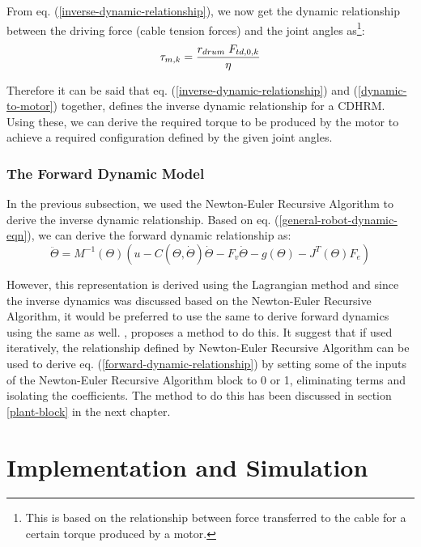 \documentclass[a4paper,12pt]{report}
\begin{document}
From eq. (\ref{inverse-dynamic-relationship}), we now get the dynamic relationship between the driving force (cable tension forces) and the joint angles as\footnote{This is based on the relationship between force transferred to the cable for a certain torque produced by a motor.}:
\begin{equation}
\label{dynamic-to-motor}
\tau_{m,k}=\dfrac{r_{drum}\hspace{1mm}F_{td,0,k}}{\eta}
\end{equation}

Therefore it can be said that eq. (\ref{inverse-dynamic-relationship}) and (\ref{dynamic-to-motor}) together, defines the inverse dynamic relationship for a CDHRM. Using these, we can derive the required torque to be produced by the motor to achieve a required configuration defined by the given joint angles.

\subsection{The Forward Dynamic Model}

In the previous subsection, we used the Newton-Euler Recursive Algorithm to derive the inverse dynamic relationship. Based on eq. (\ref{general-robot-dynamic-eqn}), we can derive the forward dynamic relationship as: 
\begin{equation}
\label{forward-dynamic-relationship}
\ddot{\Theta} = M^{-1}\left(\Theta\right)(u - C(\Theta,\dot{\Theta})\dot{\Theta} - F_v\dot{\Theta} - g\left(\Theta\right)-J^{T}\left(\Theta\right)F_e)
\end{equation}

However, this representation is derived using the Lagrangian method and since the inverse dynamics was discussed based on the Newton-Euler Recursive Algorithm, it would be preferred to use the same to derive forward dynamics using the same as well. \cite{newton-euler-pdf}, proposes a method to do this. It suggest that if used iteratively, the relationship defined by Newton-Euler Recursive Algorithm can be used to derive eq. (\ref{forward-dynamic-relationship}) by setting some of the inputs of the Newton-Euler Recursive Algorithm block to 0 or 1, eliminating terms and isolating the coefficients. The method to do this has been discussed in section \ref{plant-block} in the next chapter.


\chapter{Implementation and Simulation}
\end{document}
